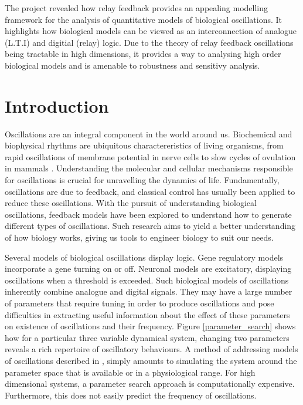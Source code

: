 \documentclass[a4paper, 12pt]{article}
\begin{document}
The project revealed how relay feedback provides an appealing modelling framework for the analysis of quantitative models of biological oscillations. It highlights how biological models can be viewed as an interconnection of analogue (L.T.I) and digitial (relay) logic. Due to the theory of relay feedback oscillations being tractable in high dimensions, it provides a way to analysing high order biological models and is amenable to robustness and sensitivy analysis. 

\newpage
\tableofcontents
\newpage
\section{Introduction}
Oscillations are an integral component in the world around us. Biochemical and biophysical rhythms are ubiquitous charactereristics of living organisms, from rapid oscillations of membrane potential in nerve cells to slow cycles of ovulation in mammals \cite{fall}. Understanding the molecular and cellular mechanisms responsible for oscillations is crucial for unravelling the dynamics of life\cite{goldbeter1}. Fundamentally, oscillations are due to feedback, and classical control has usually been applied to reduce these oscillations. With the pursuit of understanding biological oscillations, feedback models have been explored to understand how to generate different types of oscillations. Such research aims to yield a better understanding of how biology works, giving us tools to engineer biology to suit our needs. 

Several models of biological oscillations display logic. Gene regulatory models incorporate a gene turning on or off. Neuronal models are excitatory, displaying oscillations when a threshold is exceeded. Such biological models of oscillations inherently combine analogue and digital signals. They may have a large number of parameters that require tuning in order to produce oscillations and pose difficulties in extracting useful information about the effect of these parameters on existence of oscillations and their frequency. Figure \ref{parameter_search} shows how for a particular three variable dynamical system, changing two parameters reveals a rich repertoire of oscillatory behaviours. A method of addressing models of oscillations described in \cite{goldbeter1}, simply amounts to simulating the system around the parameter space that is available or in a physiological range. For high dimensional systems, a parameter search approach is computationally expensive. Furthermore, this does not easily predict the frequency of oscillations.  
\end{document}

